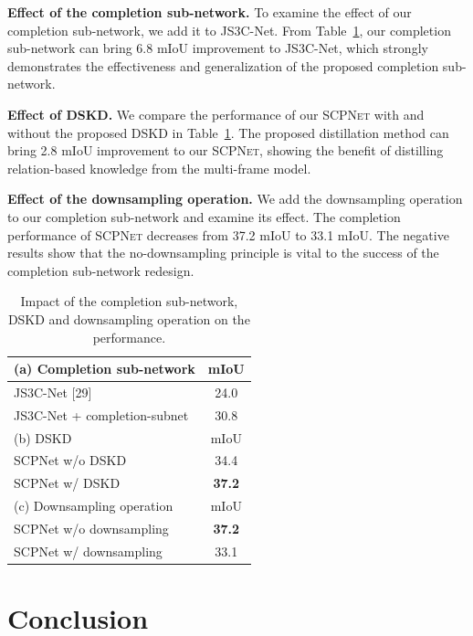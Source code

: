 \documentclass[10pt,twocolumn,letterpaper]{article}
\newcommand{\methodname}{\textsc{SCPNet}}
\begin{document}
\textbf{Effect of the completion sub-network.}
To examine the effect of our completion sub-network, we add it to JS3C-Net. From Table~\ref{tab:ablation}, our completion sub-network can bring 6.8 mIoU improvement to JS3C-Net, which strongly demonstrates the effectiveness and generalization of the proposed completion sub-network.

\textbf{Effect of DSKD.}
We compare the performance of our \methodname{} with and without the proposed DSKD in Table~\ref{tab:ablation}. The proposed distillation method can bring 2.8 mIoU improvement to our \methodname{}, showing the benefit of distilling relation-based knowledge from the multi-frame model.

\textbf{Effect of the downsampling operation.}
We add the downsampling operation to our completion sub-network and examine its effect. The completion performance of \methodname{} decreases from 37.2 mIoU to 33.1 mIoU. The negative results show that the no-downsampling principle is vital to the success of the completion sub-network redesign.

\begin{table}[htbp]
\centering
\caption{Impact of the completion sub-network, DSKD and downsampling operation on the performance.}
\label{tab:ablation}
\begin{tabular}{lc}
\toprule
(a) Completion sub-network & mIoU \\
\midrule
JS3C-Net [29]                & 24.0 \\
JS3C-Net + completion-subnet & 30.8 \\
\midrule
(b) DSKD & mIoU \\
\midrule
SCPNet w/o DSKD & 34.4 \\
SCPNet w/ DSKD  & \textbf{37.2} \\
\midrule
(c) Downsampling operation & mIoU \\
\midrule
SCPNet w/o downsampling & \textbf{37.2} \\
SCPNet w/ downsampling  & 33.1 \\
\bottomrule
\end{tabular}
\end{table}


\section{Conclusion}
\end{document}
